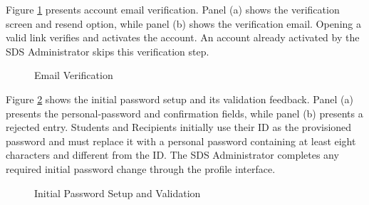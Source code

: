 Figure \ref{fig:verify} presents account email verification. Panel (a) shows the verification screen and resend option, while panel (b) shows the verification email. Opening a valid link verifies and activates the account. An account already activated by the SDS Administrator skips this verification step.

\renewcommand{\thefigure}{5.2}
\begin{figure}[htbp]
    \centering
    \begin{minipage}[t]{0.43\linewidth}
        \centering
        \vspace{0pt}
        \par{}\par
    \end{minipage}\hspace{0.04\linewidth}
    \begin{minipage}[t]{0.43\linewidth}
        \centering
        \vspace{0pt}
        \par{}\par
    \end{minipage}
    \caption{Email Verification}
    \label{fig:verify}
\end{figure}
\FloatBarrier

Figure \ref{fig:pass} shows the initial password setup and its validation feedback. Panel (a) presents the personal-password and confirmation fields, while panel (b) presents a rejected entry. Students and Recipients initially use their ID as the provisioned password and must replace it with a personal password containing at least eight characters and different from the ID. The SDS Administrator completes any required initial password change through the profile interface.

\renewcommand{\thefigure}{5.3}
\begin{figure}[htbp]
    \centering
    \begin{minipage}[t]{0.43\linewidth}
        \centering
        \vspace{0pt}
        \par{}\par
    \end{minipage}\hspace{0.04\linewidth}
    \begin{minipage}[t]{0.43\linewidth}
        \centering
        \vspace{0pt}
        \par{}\par
    \end{minipage}
    \caption{Initial Password Setup and Validation}
    \label{fig:pass}
\end{figure}
\FloatBarrier

